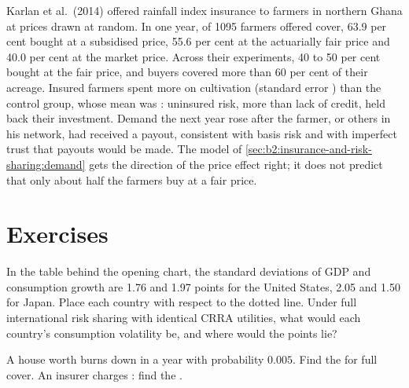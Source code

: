 \begin{record}
Karlan et al.\ (2014) offered rainfall index insurance to farmers in northern Ghana at prices drawn at
random. In one year, of \num{1095} farmers offered cover, 63.9 per cent bought at a subsidised price,
55.6 per cent at the actuarially fair price and 40.0 per cent at the market price. Across their
experiments, 40 to 50 per cent bought at the fair price, and buyers covered more than 60 per cent of
their acreage. Insured farmers spent  more on cultivation (standard error ) than the
control group, whose mean was : uninsured risk, more than lack of credit, held back their
investment. Demand the next year rose after the farmer, or others in his network, had received a
payout, consistent with basis risk and with imperfect trust that payouts would be made. The model of
\cref{sec:b2:insurance-and-risk-sharing:demand} gets the direction of the price effect right; it does
not predict that only about half the farmers buy at a fair price.
\end{record}

\section{Exercises}\label{sec:b2:insurance-and-risk-sharing:exercises}

\begin{exercise}[$\star$]\label{exo:b2:insurance-and-risk-sharing:1}
In the table behind the opening chart, the standard deviations of GDP and consumption growth are 1.76
and 1.97 points for the United States, 2.05 and 1.50 for Japan. Place each country with respect to
the dotted line. Under full international risk sharing with identical CRRA utilities, what would each
country's consumption volatility be, and where would the points lie?
\end{exercise}

\begin{exercise}[$\star$]\label{exo:b2:insurance-and-risk-sharing:2}
A house worth  burns down in a year with probability $0.005$. Find the  for full cover. An insurer charges : find the .
\end{exercise}

